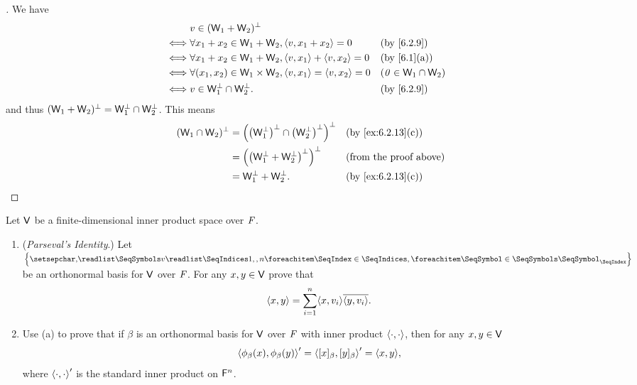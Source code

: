 \begin{proof}[]
  We have
  \begin{align*}
         & v \in (\W_1 + \W_2)^{\perp}                                                                             \\
    \iff & \forall x_1 + x_2 \in \W_1 + \W_2, \inn{v, x_1 + x_2} = 0                &  & \text{(by \cref{6.2.9})}  \\
    \iff & \forall x_1 + x_2 \in \W_1 + \W_2, \inn{v, x_1} + \inn{v, x_2} = 0       &  & \text{(by \cref{6.1}(a))} \\
    \iff & \forall (x_1, x_2) \in \W_1 \times \W_2, \inn{v, x_1} = \inn{v, x_2} = 0 &  & (\zv \in \W_1 \cap \W_2)  \\
    \iff & v \in \W_1^{\perp} \cap \W_2^{\perp}.                                    &  & \text{(by \cref{6.2.9})}
  \end{align*}
  and thus \((\mathsf{W}_1 + \mathsf{W}_2)^{\perp} = \mathsf{W}_1^{\perp} \cap \mathsf{W}_2^{\perp}\).
  This means
  \begin{align*}
    (\W_1 \cap \W_2)^{\perp} & = \pa{\pa{\W_1^{\perp}}^{\perp} \cap \pa{\W_2^{\perp}}^{\perp}}^{\perp} &  & \text{(by \cref{ex:6.2.13}(c))} \\
                             & = \pa{\pa{\W_1^{\perp} + \W_2^{\perp}}^{\perp}}^{\perp}                 &  & \text{(from the proof above)}   \\
                             & = \W_1^{\perp} + \W_2^{\perp}.                                          &  & \text{(by \cref{ex:6.2.13}(c))}
  \end{align*}
\end{proof}

\begin{ex}\label{ex:6.2.15}
  Let \(\mathsf{V}\) be a finite-dimensional inner product space over \(\mathit{F}\).
  \begin{enumerate}
    \item (\emph{Parseval's Identity}.)
          Let \(\set{\seq{v}{1,,n}}\) be an orthonormal basis for \(\mathsf{V}\) over \(\mathit{F}\).
          For any \(x, y \in \mathsf{V}\) prove that
          \[
            \inn{x, y} = \sum_{i = 1}^n \inn{x, v_i} \conj{\inn{y, v_i}}.
          \]
    \item Use (a) to prove that if \(\beta\) is an orthonormal basis for \(\mathsf{V}\) over \(\mathit{F}\) with inner product \(\left\langle\cdot, \cdot\right\rangle\), then for any \(x, y \in \mathsf{V}\)
          \[
            \inn{\phi_{\beta}(x), \phi_{\beta}(y)}' = \inn{[x]_{\beta}, [y]_{\beta}}' = \inn{x, y},
          \]
          where \(\left\langle\cdot, \cdot\right\rangle'\) is the standard inner product on \(\mathsf{F}^n\).
  \end{enumerate}
\end{ex}

